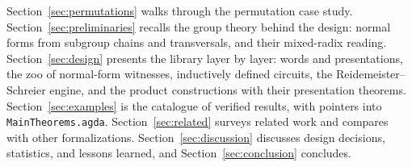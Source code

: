 Section~\ref{sec:permutations} walks through the permutation case study.
Section~\ref{sec:preliminaries} recalls the group theory behind the design:
normal forms from subgroup chains and transversals, and their mixed-radix
reading.  Section~\ref{sec:design} presents the library layer by layer:
words and presentations, the zoo of normal-form witnesses, inductively
defined circuits, the Reidemeister--Schreier engine, and the product
constructions with their presentation theorems.  Section~\ref{sec:examples}
is the catalogue of verified results, with pointers into
\texttt{MainTheorems.agda}.  Section~\ref{sec:related} surveys related work
and compares with other formalizations.  Section~\ref{sec:discussion}
discusses design decisions, statistics, and lessons learned, and
Section~\ref{sec:conclusion} concludes.
